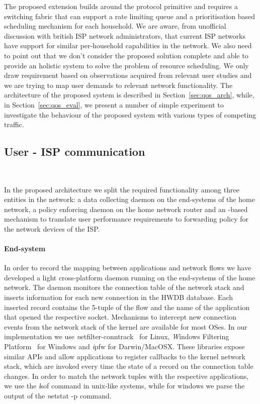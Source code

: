 The proposed extension builds around the \of protocol primitive and requires a
switching fabric that can support a rate limiting queue and a prioritisation
based scheduling mechanism for each household. We are aware, from unofficial
discussion with british ISP network administrators, that current ISP networks
have support for similar per-household capabilities in the network. We also need
to point out that we don't consider the proposed solution complete and able to
provide an holistic system to solve the problem of resource scheduling. We only
draw requirement based on observations acquired from relevant user studies and
we are trying to map user demands to relevant network functionality. The
architecture of the proposed system is described in Section~\ref{sec:qos_arch},
while, in Section~\ref{sec:qos_eval}, we present a number of simple experiment
to investigate the behaviour of the proposed system with various types of
competing traffic.

\subsection{User - ISP communication} ~\label{sec:qos_arch}

In the proposed architecture we split the required functionality among three
entities in the network: a data collecting daemon on the end-systems of the home
network, a policy enforcing daemon on the home network router and an
\of-based mechanism to translate user performance requirements to
forwarding policy for the network devices of the ISP.

\paragraph*{End-system}
In order to record the mapping between applications and network flows we have
developed a light cross-platform daemon running on the end-systems of the home
network.  The daemon monitors the connection table of the network stack and
inserts information for each new connection in the HWDB database.  Each inserted
record contains the 5-tuple of the flow and the name of the application that
opened the respective socket.  Mechanisms to intercept new connection events
from the network stack of the kernel are available for most OSes. In our
implementation we use {\emph netfilter-conntrack}~\cite{netfilter} for
Linux, {\emph Windows Filtering Platform}~\cite{win-wfp} for Windows and {\emph
  ipfw} for Darwin/MacOSX. These libraries expose similar APIs and allow
applications to register callbacks to the kernel network stack, which are
invoked every time the state of a record on the connection table changes. In
order to match the network tuples with the respective applications, we use the
{\emph lsof} command in unix-like systems, while for windows we parse the output
of the {\emph netstat -p} command.

